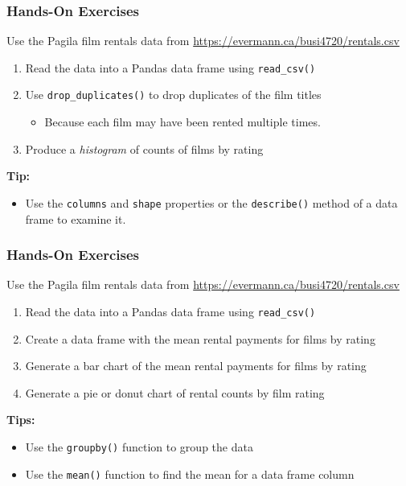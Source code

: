 \begin{tcolorbox}[colback=code]
\subsubsection*{Hands-On Exercises}

Use the Pagila film rentals data from \url{https://evermann.ca/busi4720/rentals.csv}
\begin{enumerate}
   \item Read the data into a Pandas data frame using \texttt{read\_csv()}
   \item Use \texttt{drop\_duplicates()} to drop duplicates of the film titles
   \begin{itemize}
      \item Because each film may have been rented multiple times.
   \end{itemize}
   \item Produce a \emph{histogram} of counts of films by rating
\end{enumerate}
\vspace{\baselineskip}
\textbf{Tip:}
\begin{itemize}
\item Use the \texttt{columns} and \texttt{shape} properties or the \texttt{describe()} method of a data frame to examine it. 
\end{itemize}
\end{tcolorbox}

\begin{tcolorbox}[colback=code]
\subsubsection*{Hands-On Exercises}

Use the Pagila film rentals data from \url{https://evermann.ca/busi4720/rentals.csv}
\begin{enumerate}
   \item Read the data into a Pandas data frame using \texttt{read\_csv()}
   \item Create a data frame with the mean rental payments for films by rating
   \item Generate a bar chart of the mean rental payments for films by rating
   \item Generate a pie or donut chart of rental counts by film rating
\end{enumerate}

\vspace{\baselineskip}
\textbf{Tips:}
\begin{itemize}
   \item Use the \texttt{groupby()} function to group the data
   \item Use the \texttt{mean()} function to find the mean for a data frame column
\end{itemize}
\end{tcolorbox}


